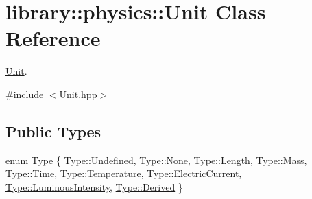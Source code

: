 \hypertarget{classlibrary_1_1physics_1_1_unit}{}\section{library\+:\+:physics\+:\+:Unit Class Reference}
\label{classlibrary_1_1physics_1_1_unit}


\hyperlink{classlibrary_1_1physics_1_1_unit}{Unit}.  




{\ttfamily \#include $<$Unit.\+hpp$>$}

\subsection*{Public Types}
\begin{DoxyCompactItemize}
\item 
enum \hyperlink{classlibrary_1_1physics_1_1_unit_ab01b0024991fd80f3e5ef7c8282fccc1}{Type} \{ \newline
\hyperlink{classlibrary_1_1physics_1_1_unit_ab01b0024991fd80f3e5ef7c8282fccc1aec0fc0100c4fc1ce4eea230c3dc10360}{Type\+::\+Undefined}, 
\hyperlink{classlibrary_1_1physics_1_1_unit_ab01b0024991fd80f3e5ef7c8282fccc1a6adf97f83acf6453d4a6a4b1070f3754}{Type\+::\+None}, 
\hyperlink{classlibrary_1_1physics_1_1_unit_ab01b0024991fd80f3e5ef7c8282fccc1aba2a9c6c8c77e03f83ef8bf543612275}{Type\+::\+Length}, 
\hyperlink{classlibrary_1_1physics_1_1_unit_ab01b0024991fd80f3e5ef7c8282fccc1aff2864d6f652ee0ac254814f1ae4f4a8}{Type\+::\+Mass}, 
\newline
\hyperlink{classlibrary_1_1physics_1_1_unit_ab01b0024991fd80f3e5ef7c8282fccc1aa76d4ef5f3f6a672bbfab2865563e530}{Type\+::\+Time}, 
\hyperlink{classlibrary_1_1physics_1_1_unit_ab01b0024991fd80f3e5ef7c8282fccc1aee7a8e262285ed49ea1b4e4ae11525bd}{Type\+::\+Temperature}, 
\hyperlink{classlibrary_1_1physics_1_1_unit_ab01b0024991fd80f3e5ef7c8282fccc1a9a60fd92ac6161bffa549ef2cd17f05e}{Type\+::\+Electric\+Current}, 
\hyperlink{classlibrary_1_1physics_1_1_unit_ab01b0024991fd80f3e5ef7c8282fccc1ae91a9eb4f5dcc51ea18e180ea981d6ae}{Type\+::\+Luminous\+Intensity}, 
\newline
\hyperlink{classlibrary_1_1physics_1_1_unit_ab01b0024991fd80f3e5ef7c8282fccc1a0e77a10e9579997fa646fbda4118e108}{Type\+::\+Derived}
 \}
\end{DoxyCompactItemize}
